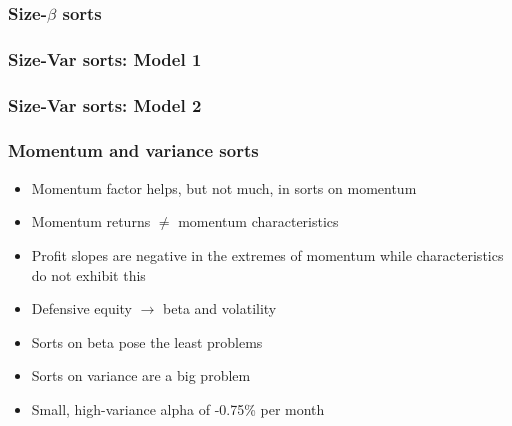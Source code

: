 \documentclass[notes]{beamer}  %
\begin{document}
\begin{frame}
  \frametitle{Size-$\beta$ sorts}
  \begin{center}
  \resizebox*{!}{\dimexpr\textheight-1.3cm\relax}{
    
    }
  \end{center}
\end{frame}


\begin{frame}
  \frametitle{Size-Var sorts: Model 1}
  \begin{center}
  \resizebox*{!}{\dimexpr\textheight-1.3cm\relax}{
    
    }
  \end{center}
\end{frame}


\begin{frame}
  \frametitle{Size-Var sorts: Model 2}
  \begin{center}
  \resizebox*{!}{\dimexpr\textheight-1.3cm\relax}{
    
    }
  \end{center}
\end{frame}

\begin{frame} \frametitle{Momentum and variance sorts}
  \begin{itemize}
    \item Momentum factor helps, but not much, in sorts on momentum
    \item Momentum returns $\neq$ momentum characteristics
    \item Profit slopes are negative in the extremes of momentum while
    characteristics do not exhibit this
    \item Defensive equity $\rightarrow$ beta and volatility
    \parencite{novy2014understanding}
    \item Sorts on beta pose the least problems
    \item Sorts on variance are a big problem
    \item Small, high-variance alpha of -0.75\% per month
  \end{itemize}
\end{frame}
\end{document}
